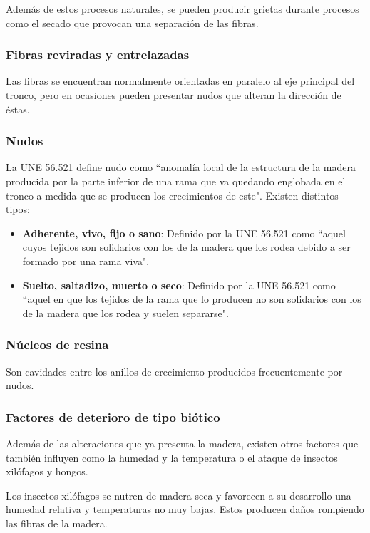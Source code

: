 Además de estos procesos naturales, se pueden producir grietas durante procesos como el secado que provocan una separación de las fibras.

\subsubsection{Fibras reviradas y entrelazadas}

Las fibras se encuentran normalmente orientadas en paralelo al eje principal del tronco, pero en ocasiones pueden presentar nudos que alteran la dirección de éstas.

\subsubsection{Nudos}

La UNE 56.521 define nudo como ``anomalía local de la estructura de la madera producida por la parte inferior de una rama que va quedando englobada en el tronco a medida que se producen los crecimientos de este". Existen distintos tipos:

\begin{itemize}
	\item \textbf{Adherente, vivo, fijo o sano}: Definido por la UNE 56.521 como ``aquel cuyos tejidos son solidarios con los de la madera que los rodea debido a ser formado por una rama viva".
	\item \textbf{Suelto, saltadizo, muerto o seco}: Definido por la UNE 56.521 como ``aquel en que los tejidos de la rama que lo producen no son solidarios con los de la madera que los rodea y suelen separarse".
\end{itemize}

\subsubsection{Núcleos de resina}

Son cavidades entre los anillos de crecimiento producidos frecuentemente por nudos.

\subsubsection{Factores de deterioro de tipo biótico}

Además de las alteraciones que ya presenta la madera, existen otros factores que también influyen como la humedad y la temperatura o el ataque de insectos xilófagos y hongos.

Los insectos xilófagos se nutren de madera seca y favorecen a su desarrollo una humedad relativa y temperaturas no muy bajas. Estos producen daños rompiendo las fibras de la madera.

